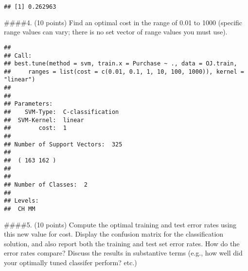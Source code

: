 \documentclass[]{article}
\newenvironment{Shaded}{\begin{snugshade}}{\end{snugshade}}
\newcommand{\CommentTok}[1]{\textcolor[rgb]{0.56,0.35,0.01}{\textit{#1}}}
\newcommand{\DataTypeTok}[1]{\textcolor[rgb]{0.13,0.29,0.53}{#1}}
\newcommand{\DecValTok}[1]{\textcolor[rgb]{0.00,0.00,0.81}{#1}}
\newcommand{\FloatTok}[1]{\textcolor[rgb]{0.00,0.00,0.81}{#1}}
\newcommand{\KeywordTok}[1]{\textcolor[rgb]{0.13,0.29,0.53}{\textbf{#1}}}
\newcommand{\NormalTok}[1]{#1}
\newcommand{\OperatorTok}[1]{\textcolor[rgb]{0.81,0.36,0.00}{\textbf{#1}}}
\newcommand{\StringTok}[1]{\textcolor[rgb]{0.31,0.60,0.02}{#1}}
\begin{document}
\begin{verbatim}
## [1] 0.262963
\end{verbatim}

\#\#\#\#4. (10 points) Find an optimal cost in the range of 0.01 to 1000
(specific range values can vary; there is no set vector of range values
you must use).

\begin{Shaded}
\end{Shaded}

\begin{verbatim}
## 
## Call:
## best.tune(method = svm, train.x = Purchase ~ ., data = OJ.train, 
##     ranges = list(cost = c(0.01, 0.1, 1, 10, 100, 1000)), kernel = "linear")
## 
## 
## Parameters:
##    SVM-Type:  C-classification 
##  SVM-Kernel:  linear 
##        cost:  1 
## 
## Number of Support Vectors:  325
## 
##  ( 163 162 )
## 
## 
## Number of Classes:  2 
## 
## Levels: 
##  CH MM
\end{verbatim}

\#\#\#\#5. (10 points) Compute the optimal training and test error rates
using this new value for cost. Display the confusion matrix for the
classification solution, and also report both the training and test set
error rates. How do the error rates compare? Discuss the results in
substantive terms (e.g., how well did your optimally tuned classifer
perform? etc.)
\end{document}

